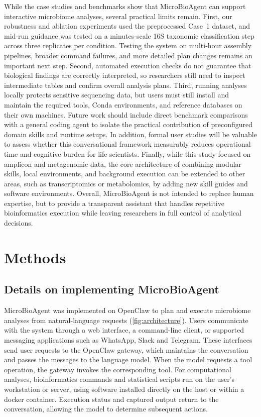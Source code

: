 \documentclass[10pt,letterpaper]{article}
\begin{document}
While the case studies and benchmarks show that MicroBioAgent can support
interactive microbiome analyses, several practical limits remain.  First, our
robustness and ablation experiments used the preprocessed Case~1 dataset, and
mid-run guidance was tested on a minutes-scale 16S taxonomic classification step
across three replicates per condition.  Testing the system on multi-hour
assembly pipelines, broader command failures, and more detailed plan changes
remains an important next step.  Second, automated execution checks do not
guarantee that biological findings are correctly interpreted, so researchers
still need to inspect intermediate tables and confirm overall analysis plans.
Third, running analyses locally protects sensitive sequencing data, but users
must still install and maintain the required tools, Conda environments, and
reference databases on their own machines.  Future work should include direct
benchmark comparisons with a general coding agent to isolate the practical
contribution of preconfigured domain skills and runtime setups.  In addition,
formal user studies will be valuable to assess whether this conversational
framework measurably reduces operational time and cognitive burden for life
scientists.  Finally, while this study focused on amplicon and metagenomic data,
the core architecture of combining modular skills, local environments, and
background execution can be extended to other areas, such as transcriptomics or
metabolomics, by adding new skill guides and software environments.  Overall,
MicroBioAgent is not intended to replace human expertise, but to provide a
transparent assistant that handles repetitive bioinformatics execution while
leaving researchers in full control of analytical decisions.

\section{Methods}
\label{sec:methods}

\subsection{Details on implementing MicroBioAgent}
\label{sec:system-overview}

MicroBioAgent was implemented on OpenClaw to plan and execute microbiome
analyses from natural-language requests (\cref{fig:architecture}).  Users
communicate with the system through a web interface, a command-line client,
or supported messaging applications such as WhatsApp, Slack and Telegram.
These interfaces send user requests to the OpenClaw gateway, which maintains
the conversation and passes the messages to the language model.  When the
model requests a tool operation, the gateway invokes the corresponding tool.
For computational analyses, bioinformatics commands and statistical scripts
run on the user's workstation or server, using software installed directly
on the host or within a docker container.  Execution status and captured output
return to the conversation, allowing the model to determine subsequent actions.
\end{document}
